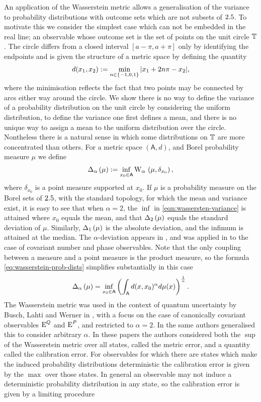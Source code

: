 An application of the Wasserstein metric allows a generalisation of the variance to probability distributions with outcome sets which are not subsets of $2.5$. To motivate this we consider the simplest case which can not be embedded in the real line; an observable whose outcome set is the set of points on the unit circle $\mathbb{T}$. The circle differs from a closed interval $[a-\pi, a+\pi]$ only by identifying the endpoints and is given the structure of a metric space by defining the quantity
\begin{align}
  d(x_1,x_2) := \min_{n\in \{-1,0,1\}} {\left\lvert{x_1 + 2n\pi - x_2}\right\rvert},
\end{align}
where the minimisation reflects the fact that two points may be connected by arcs either way around the circle. We show there is no way to define the variance of a probability distribution on the unit circle by considering the uniform distribution, to define the variance one first defines a mean, and there is no unique way to assign a mean to the uniform distribution over the circle. Nontheless there is a natural sense in which some distributions on $\mathbb{T}$ are more concentrated than others. For a metric space $(\mathsf{A}, d)$, and Borel probability measure $\mu$ we define
\begin{align}
  \wsDev{\mu}[\alpha] \defeq \inf_{x_0\in\mathsf{A}} \ws{\mu, \delta_{x_0}}[\alpha], \label{eqn:wassersten-variance}
\end{align}
where $\delta_{x_0}$ is a point measure supported at $x_0$. If $\mu$ is a probability measure on the Borel sets of $2.5$, with the standard topology, for which the mean and variance exist, it is easy to see that when $\alpha=2$, the $\inf$ in \ref{eqn:wassersten-variance} is attained where $x_0$ equals the mean, and that $\wsDev{\mu}[2]$ equals the standard deviation of $\mu$. Similarly, $\wsDev{\mu}[1]$ is the absolute deviation, and the infimum is attained at the median. The $\alpha$-deviation appears in \cite{blw-meas-uncertainty}, and was applied in \cite{sharp-ur-num-angle} to the case of covariant number and phase observables. Note that the only coupling between a measure and a point measure is the product measure, so the formula \eqref{eq:wasserstein-prob-dists} simplifies substantially in this case
\begin{align}
  \wsDev{\mu}[\alpha] = \inf_{x_0\in\mathsf{A}} \left(\int_{\mathsf{A}} d(x,x_0)^\alpha d\mu(x)\right)^\frac{1}{\alpha}.
\end{align}
The Wasserstein metric was used in the context of quantum uncertainty by Busch, Lahti and Werner in \cite{PhysRevLett.111.160405}, with a focus on the case of canonically covariant observables $\operatorname{E}^Q$ and $\operatorname{E}^P$, and restricted to $\alpha=2$. In \cite{blw-meas-uncertainty} the same authors generalised this to consider arbitrary $\alpha$. In these papers the authors considered both the $\sup$ of the Wasserstein metric over all states, called the metric error, and a quantity called the calibration error. For observables for which there are states which make the induced probability distributions deterministic the calibration error is given by the $\max$ over those states. In general an observable may not induce a deterministic probability distribution in any state, so the calibration error is given by a limiting procedure
